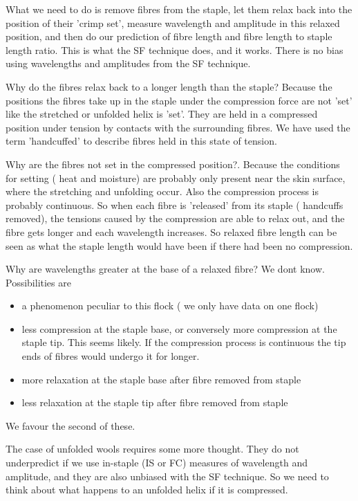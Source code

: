 \documentclass[titlepage,10pt]{article}  %
\begin{document}
What we need to do is remove fibres from the staple, let them relax back into the position of their 'crimp set', measure wavelength and amplitude in this relaxed position, and then do our prediction of fibre length and fibre length to staple length ratio. This is what the SF technique does, and it works. There is no bias using wavelengths and amplitudes from the SF technique.


Why do the fibres relax back to a longer length than the staple? Because the positions the fibres take up in the staple under the compression force are not 'set' like the stretched or unfolded helix is 'set'. They are held in a compressed position under tension by contacts with the surrounding fibres. We have used the term 'handcuffed' to describe fibres held in this state of tension.

Why are the fibres not set in the compressed position?. Because the conditions for setting ( heat and moisture) are probably only present near the skin surface, where the stretching and unfolding occur. Also the compression process is probably continuous. So when each fibre is 'released' from its staple ( handcuffs removed), the tensions caused by the compression are able to relax out, and the fibre gets longer and each wavelength increases.  So relaxed fibre length can be seen as what the staple length would have been if there had been no compression.

Why are wavelengths greater at the base of a relaxed fibre? We dont know. Possibilities are
\begin{itemize}
\item a phenomenon peculiar to this flock ( we only have data on one flock)
\item less compression at the staple base, or conversely more compression at the staple tip. This seems likely. If the compression process is continuous the tip ends of fibres would undergo it for longer.
\item more relaxation at the staple base after fibre removed from staple
\item less relaxation at the staple tip after fibre removed from staple
\end{itemize}


We favour the second of these. 

The case of unfolded wools requires some more thought. They do not underpredict if we use in-staple (IS or FC) measures of wavelength and amplitude, and they are also unbiased with the SF technique. So we need to think about what happens to an unfolded helix if it is compressed. 
\end{document}

